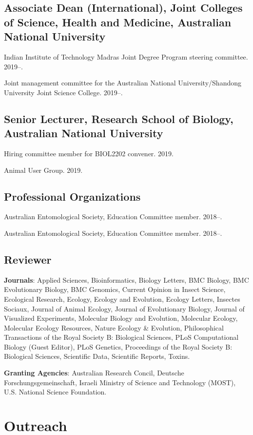 \documentclass[11pt]{article}
\begin{document}
\subsection{Associate Dean (International), Joint Colleges of Science, Health and
Medicine, Australian National University}
\ind Indian Institute of Technology Madras Joint Degree Program steering
committee. 2019--.

\ind Joint management committee for the Australian National
University/Shandong University Joint Science College. 2019--.

\subsection{Senior Lecturer, Research School of Biology, Australian National
University}
\ind Hiring committee member for BIOL2202 convener. 2019.

\ind Animal User Group. 2019.

\subsection{Professional Organizations}
\ind Australian Entomological Society, Education Committee member. 2018--.

\ind Australian Entomological Society, Education Committee member. 2018--.

\subsection{Reviewer}
\ind \textbf{Journals}: Applied Sciences, Bioinformatics, Biology Letters,
BMC Biology, BMC Evolutionary Biology, BMC Genomics, Current Opinion in
Insect Science, Ecological Research, Ecology, Ecology and Evolution,
Ecology Letters, Insectes Sociaux, Journal of Animal Ecology, Journal of
Evolutionary Biology, Journal of Visualized Experiments, Molecular
Biology and Evolution, Molecular Ecology, Molecular Ecology Resources,
Nature Ecology \& Evolution, Philosophical Transactions of the Royal
Society B: Biological Sciences, PLoS Computational Biology (Guest
Editor), PLoS Genetics, Proceedings of the Royal Society B: Biological
Sciences, Scientific Data, Scientific Reports, Toxins. 

\ind \textbf{Granting Agencies}: Australian Research Concil, Deutsche
Forschungsgemeinschaft, Israeli Ministry of Science and Technology
(MOST), U.S. National Science Foundation. 


\section{Outreach}
\end{document}
